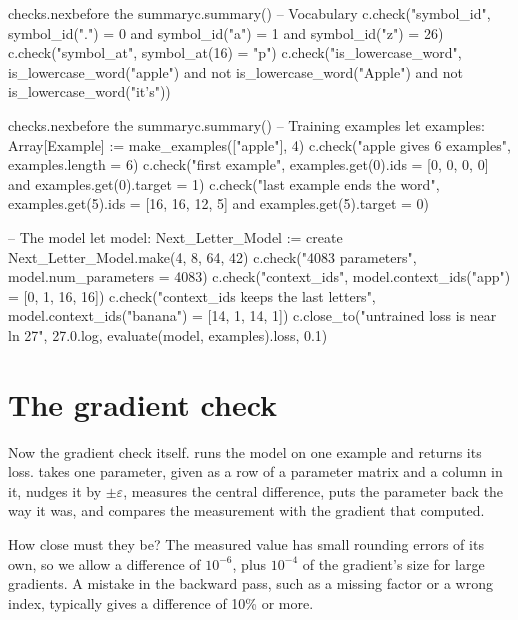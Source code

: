 \documentclass[11pt,a4paper,oneside,openany]{book}
\newcommand{\code}[1]{\texttt{\detokenize{#1}}}
\begin{document}
\begin{addbefore}{checks.nex}{before the summary}{c.summary()}
-- Vocabulary
c.check("symbol_id", symbol_id(".") = 0 and symbol_id("a") = 1 and symbol_id("z") = 26)
c.check("symbol_at", symbol_at(16) = "p")
c.check("is_lowercase_word", is_lowercase_word("apple") and not is_lowercase_word("Apple")
  and not is_lowercase_word("it's"))
\end{addbefore}

\begin{addbefore}{checks.nex}{before the summary}{c.summary()}
-- Training examples
let examples: Array[Example] := make_examples(["apple"], 4)
c.check("apple gives 6 examples", examples.length = 6)
c.check("first example", examples.get(0).ids = [0, 0, 0, 0]
  and examples.get(0).target = 1)
c.check("last example ends the word", examples.get(5).ids = [16, 16, 12, 5]
  and examples.get(5).target = 0)

-- The model
let model: Next_Letter_Model := create Next_Letter_Model.make(4, 8, 64, 42)
c.check("4083 parameters", model.num_parameters = 4083)
c.check("context_ids", model.context_ids("app") = [0, 1, 16, 16])
c.check("context_ids keeps the last letters",
  model.context_ids("banana") = [14, 1, 14, 1])
c.close_to("untrained loss is near ln 27", 27.0.log, evaluate(model, examples).loss, 0.1)
\end{addbefore}

\section{The gradient check}

Now the gradient check itself. \code{loss_on} runs the model on one
example and returns its loss. \code{gradient_matches} takes one parameter,
given as a row of a parameter matrix and a column in it, nudges it by
$\pm\varepsilon$, measures the central difference, puts the parameter back
the way it was, and compares the measurement with the gradient that
\code{backward} computed.

How close must they be? The measured value has small rounding errors of
its own, so we allow a difference of $10^{-6}$, plus $10^{-4}$ of the
gradient's size for large gradients. A mistake in the backward pass, such
as a missing factor or a wrong index, typically gives a difference of 10\%
or more.
\end{document}
